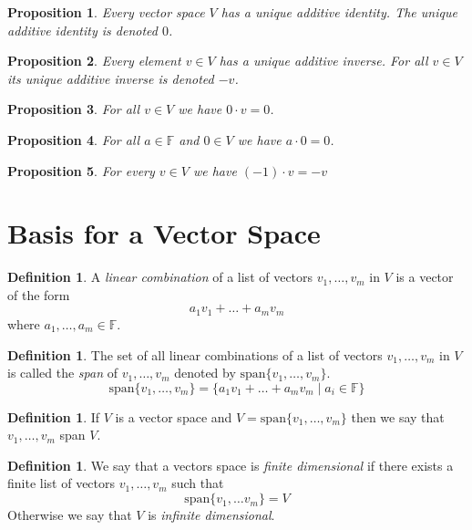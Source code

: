 \documentclass[12pt,letterpaper]{article}
\theoremstyle{plain}
\newtheorem{proposition}{Proposition}[section]
\theoremstyle{definition}
\newtheorem{definition}[theorem]{Definition}
\numberwithin{equation}{section}
\begin{document}
\begin{proposition}Every vector space $V$ has a unique additive identity. The unique additive identity is denoted $0$. 
\end{proposition}

\begin{proposition}Every element $v\in V$ has a unique additive inverse. For all $v\in V$ its unique additive inverse is denoted $-v$. 
\end{proposition}

\begin{proposition}For all $v\in V$ we have $0\cdot v=0$. 
\end{proposition}

\begin{proposition}For all $a\in \mathbb{F}$ and $0\in V$ we have $a\cdot 0=0$.
\end{proposition}

\begin{proposition}For every $v\in V$ we have $(-1)\cdot v=-v$
\end{proposition}

\section{Basis for a Vector Space}

\begin{definition} A \emph{linear combination} of a list of vectors $v_1,\ldots, v_m$ in $V$ is a vector of the form 
\[a_1v_1+\ldots+a_mv_m\]
where $a_1,\ldots, a_m\in \mathbb{F}$. 
\end{definition}

\begin{definition} The set of all linear combinations of a list of vectors $v_1, \ldots, v_m$ in $V$ is called the \emph{span} of $v_1, \ldots,v_m$ denoted by 
$\text{span}\{v_1,\ldots,v_m\}$.
\[\text{span}\{v_1,\ldots,v_m\}=\{a_1v_1+\ldots+a_mv_m\mid a_i\in \mathbb{F}\}\]
\end{definition}

\begin{definition} If $V$ is a vector space and $V=\text{span}\{v_1,\ldots,v_m\}$ then we say that $v_1, \ldots, v_m$ span $V$. 
\end{definition}

\begin{definition} We say that a vectors space is \emph{finite dimensional} if there exists a finite list of vectors $v_1,\ldots, v_m$ such that 
\[\text{span}\{v_1,\ldots v_m\}=V\] 
Otherwise we say that $V$ is \emph{infinite dimensional}.
\end{definition}
\end{document}
